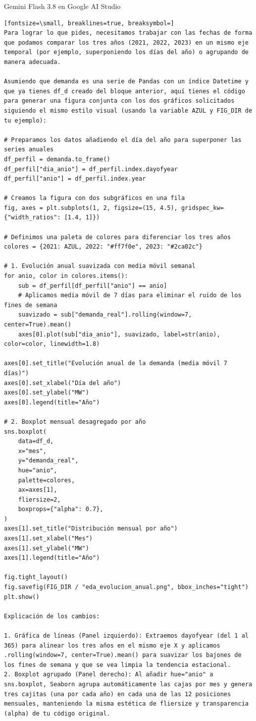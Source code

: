 \documentclass[12pt,a4paper,oneside]{book}
\begin{document}
\begin{iaresp}{Gemini Flash 3.8 en Google AI Studio}
\begin{Verbatim}[fontsize=\small, breaklines=true, breaksymbol=]
Para lograr lo que pides, necesitamos trabajar con las fechas de forma que podamos comparar los tres años (2021, 2022, 2023) en un mismo eje temporal (por ejemplo, superponiendo los días del año) o agrupando de manera adecuada.

Asumiendo que demanda es una serie de Pandas con un índice Datetime y que ya tienes df_d creado del bloque anterior, aquí tienes el código para generar una figura conjunta con los dos gráficos solicitados siguiendo el mismo estilo visual (usando la variable AZUL y FIG_DIR de tu ejemplo):

# Preparamos los datos añadiendo el día del año para superponer las series anuales
df_perfil = demanda.to_frame()
df_perfil["dia_anio"] = df_perfil.index.dayofyear
df_perfil["anio"] = df_perfil.index.year

# Creamos la figura con dos subgráficos en una fila
fig, axes = plt.subplots(1, 2, figsize=(15, 4.5), gridspec_kw={"width_ratios": [1.4, 1]})

# Definimos una paleta de colores para diferenciar los tres años
colores = {2021: AZUL, 2022: "#ff7f0e", 2023: "#2ca02c"}

# 1. Evolución anual suavizada con media móvil semanal
for anio, color in colores.items():
    sub = df_perfil[df_perfil["anio"] == anio]
    # Aplicamos media móvil de 7 días para eliminar el ruido de los fines de semana
    suavizado = sub["demanda_real"].rolling(window=7, center=True).mean()
    axes[0].plot(sub["dia_anio"], suavizado, label=str(anio), color=color, linewidth=1.8)

axes[0].set_title("Evolución anual de la demanda (media móvil 7 días)")
axes[0].set_xlabel("Día del año")
axes[0].set_ylabel("MW")
axes[0].legend(title="Año")

# 2. Boxplot mensual desagregado por año
sns.boxplot(
    data=df_d,
    x="mes",
    y="demanda_real",
    hue="anio",
    palette=colores,
    ax=axes[1],
    fliersize=2,
    boxprops={"alpha": 0.7},
)
axes[1].set_title("Distribución mensual por año")
axes[1].set_xlabel("Mes")
axes[1].set_ylabel("MW")
axes[1].legend(title="Año")

fig.tight_layout()
fig.savefig(FIG_DIR / "eda_evolucion_anual.png", bbox_inches="tight")
plt.show()

Explicación de los cambios:

1. Gráfica de líneas (Panel izquierdo): Extraemos dayofyear (del 1 al 365) para alinear los tres años en el mismo eje X y aplicamos .rolling(window=7, center=True).mean() para suavizar los bajones de los fines de semana y que se vea limpia la tendencia estacional.
2. Boxplot agrupado (Panel derecho): Al añadir hue="anio" a sns.boxplot, Seaborn agrupa automáticamente las cajas por mes y genera tres cajitas (una por cada año) en cada una de las 12 posiciones mensuales, manteniendo la misma estética de fliersize y transparencia (alpha) de tu código original.
\end{Verbatim}
\end{iaresp}
\end{document}
